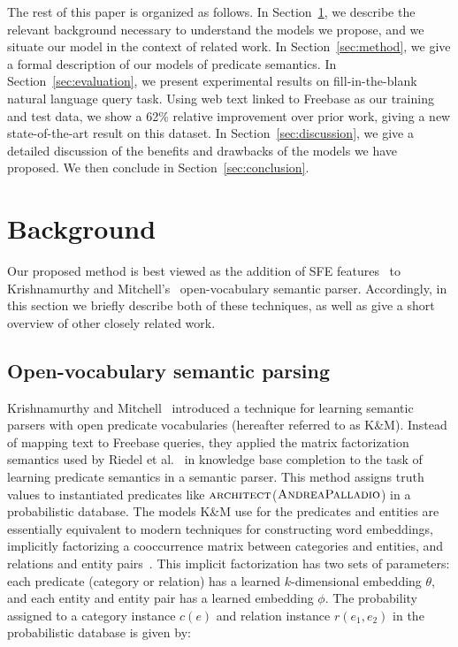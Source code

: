 \documentclass[11pt]{article}
\newcommand{\secref}[1]{Section~\ref{sec:#1}}
\newcommand{\predicate}[1]{\ensuremath{\textsc{#1}}}
\newcommand{\entity}[1]{\ensuremath{\textsc{#1}}}
\begin{document}
The rest of this paper is organized as follows.  In \secref{background}, we
describe the relevant background necessary to understand the models we propose,
and we situate our model in the context of related work.  In \secref{method},
we give a formal description of our models of predicate semantics.  In
\secref{evaluation}, we present experimental results on fill-in-the-blank
natural language query task.  Using web text linked to Freebase as our training
and test data, we show a 62\% relative improvement over prior work, giving a
new state-of-the-art result on this dataset.  In \secref{discussion}, we give a
detailed discussion of the benefits and drawbacks of the models we have
proposed.  We then conclude in \secref{conclusion}.

\section{Background}
\label{sec:background}

Our proposed method is best viewed as the addition of SFE
features~\cite{gardner-2015-sfe} to Krishnamurthy and
Mitchell's~
open-vocabulary semantic parser.  Accordingly, in this section we briefly
describe both of these techniques, as well as give a short overview of other
closely related work.

\subsection{Open-vocabulary semantic parsing}
\label{sec:jayant-semparse}

Krishnamurthy and
Mitchell~ introduced a
technique for learning semantic parsers with open predicate vocabularies
(hereafter referred to as K\&M).  Instead of mapping text to Freebase queries,
they applied the matrix factorization semantics used by Riedel et
al.~ in knowledge base completion to
the task of learning predicate semantics in a semantic parser.  This method
assigns truth values to instantiated predicates like
\predicate{architect}(\entity{AndreaPalladio}) in a probabilistic database.
The models K\&M use for the predicates and entities are essentially equivalent
to modern techniques for constructing word embeddings, implicitly factorizing a
cooccurrence matrix between categories and entities, and relations and entity
pairs~\cite{levy-2014-w2v-as-mf}.  This implicit factorization has two sets of
parameters: each predicate (category or relation) has a learned $k$-dimensional
embedding $\theta$, and each entity and entity pair has a learned embedding
$\phi$.  The probability assigned to a category instance $c(e)$ and relation
instance $r(e_1, e_2)$ in the probabilistic database is given by:
\end{document}
